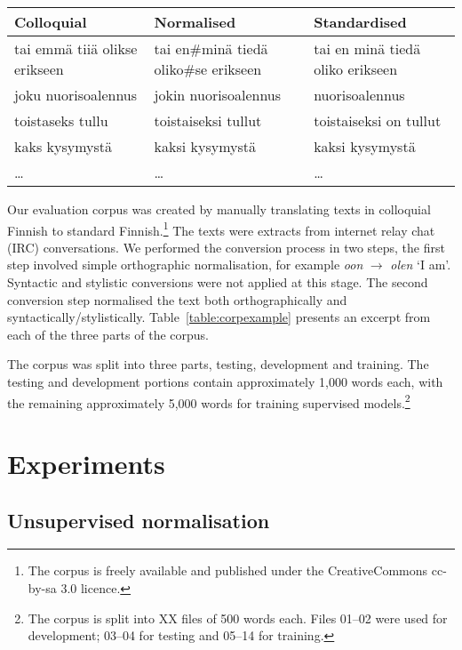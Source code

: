 \documentclass[11pt]{article}
\begin{document}
\begin{table*}
  \centering
  \begin{tabular}{|l|l|l|}
  \hline
  \textbf{Colloquial} & \textbf{Normalised} & \textbf{Standardised} \\
  \hline
  tai emm\"{a} tii\"{a} olikse erikseen & tai en\#min\"{a} tied\"{a} oliko\#se erikseen & tai en min\"{a} tied\"{a} oliko erikseen \\
  joku nuorisoalennus                             & jokin nuorisoalennus & nuorisoalennus \\
  \hline
   toistaseks tullu        & toistaiseksi tullut  & toistaiseksi on tullut  \\
   kaks kysymyst\"{a}       & kaksi kysymyst\"{a} & kaksi kysymyst\"{a} \\
  \hline
  \ldots & \ldots & \ldots \\
  \hline
  \end{tabular}
  \caption{Example sentences from the parallel corpus.}
  \label{table:corpexample}
\end{table*}

Our evaluation corpus was created by manually translating texts in colloquial Finnish
to standard Finnish.\footnote{The corpus is freely available and published under the 
CreativeCommons {\sc cc-by-sa} 3.0 licence.} The texts were extracts from internet 
relay chat (IRC) conversations. We performed the conversion process in two steps, the first
step involved simple orthographic normalisation, for 
example \emph{oon} $\rightarrow$ \emph{olen} `I am'. Syntactic and stylistic conversions 
were not applied at this stage. The second conversion step normalised the text
both orthographically and syntactically/stylistically. Table~\ref{table:corpexample} presents
an excerpt from each of the three parts of the corpus.

The corpus was split into three parts, testing, development and training. The testing
and development portions contain approximately 1,000 words each, with the remaining approximately 5,000 words for training
supervised models.\footnote{The corpus is split into XX files of 500 words each. Files 01--02 
  were used for development; 03--04 for testing and 05--14 for training.}

\section{Experiments}

\subsection{Unsupervised normalisation}
\end{document}

